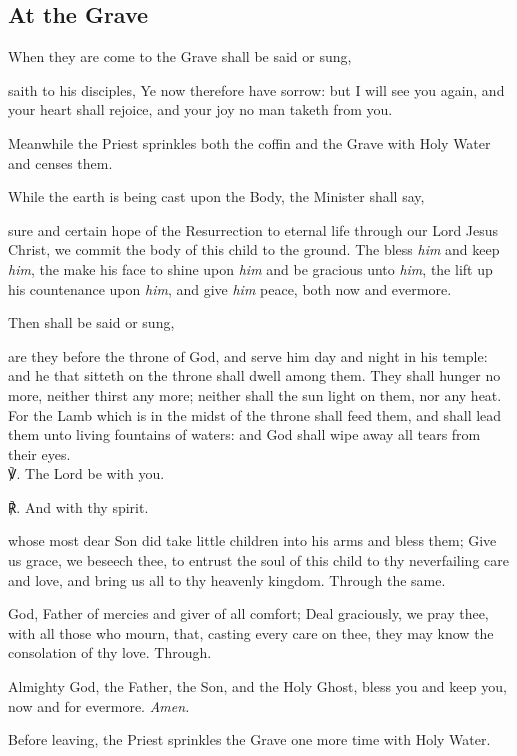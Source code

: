 \subsection{At the Grave}
\begin{rubric}
    When they are come to the Grave shall be said or sung,
\end{rubric}
 saith to his disciples, Ye now therefore have sorrow: but I will see you again, and your heart shall rejoice, and your joy no man taketh from you.

\begin{rubric}
    Meanwhile the Priest sprinkles both the coffin and the Grave with Holy Water and censes them.\par
    While the earth is being cast upon the Body, the Minister shall say,
\end{rubric}\par

 sure and certain hope of the Resurrection to eternal life through our Lord Jesus Christ, we commit the body of this child to the ground. The  bless \textit{him} and keep \textit{him}, the  make his face to shine upon \textit{him} and be gracious unto \textit{him}, the  lift up his countenance upon \textit{him}, and give \textit{him} peace, both now and evermore.

\begin{rubric}
    Then shall be said or sung,
\end{rubric}

 are they before the throne of God, and serve him day and night in his temple: and he that sitteth on the throne shall dwell among them. They shall hunger no more, neither thirst any more; neither shall the sun light on them, nor any heat. For the Lamb which is in the midst of the throne shall feed them, and shall lead them unto living fountains of waters: and God shall wipe away all tears from their eyes.\\

℣. The Lord be with you.

℟. And with thy spirit.

{} whose most dear Son did take little children into his arms and bless them; Give us grace, we beseech thee, to entrust the soul of this child to thy neverfailing care and love, and bring us all to thy heavenly kingdom. Through the same.\par

 God, Father of mercies and giver of all comfort; Deal graciously, we pray thee, with all those who mourn, that, casting every care on thee, they may know the consolation of thy love. Through.\par

 Almighty God, the Father, the {} Son, and the Holy Ghost, bless you and keep you, now and for evermore. \textit{Amen.}


\begin{rubric}
    Before leaving, the Priest sprinkles the Grave one more time with Holy Water.
\end{rubric}